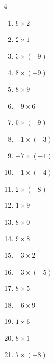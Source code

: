 \begin{multicols}{4}
\begin{enumerate}
  \item $9\times 2$
        \phantom{$=18$}

  \item $2\times 1$
        \phantom{$=2$}

  \item $3\times (-9)$
        \phantom{$=-27$}

  \item $8\times (-9)$
        \phantom{$=-72$}

  \item $8\times 9$
        \phantom{$=72$}

  \item $-9\times 6$
        \phantom{$=-54$}

  \item $0\times (-9)$
        \phantom{$=0$}

  \item $-1\times (-3)$
        \phantom{$=3$}

  \item $-7\times (-1)$
        \phantom{$=7$}

  \item $-1\times (-4)$
        \phantom{$=4$}

  \item $2\times (-8)$
        \phantom{$=-16$}

  \item $1\times 9$
        \phantom{$=9$}

  \item $8\times 0$
        \phantom{$=0$}

  \item $9\times 8$
        \phantom{$=72$}

  \item $-3\times 2$
        \phantom{$=-6$}

  \item $-3\times (-5)$
        \phantom{$=15$}

  \item $8\times 5$
        \phantom{$=40$}

  \item $-6\times 9$
        \phantom{$=-54$}

  \item $1\times 6$
        \phantom{$=6$}

  \item $8\times 1$
        \phantom{$=8$}

  \item $7\times (-8)$
        \phantom{$=-56$}


\end{enumerate}
\end{multicols}
